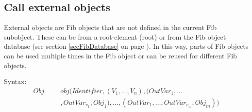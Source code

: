 

\subsection{Call external objects}
\label{fibExtObject}

External objects are Fib objects that are not defined in the current Fib subobject. These can be from a root-element (root) or from the Fib object database (see section \ref{secFibDatabase} on page \pageref{secFibDatabase}). In this way, parts of Fib objects can be used multiple times in the Fib object or can be reused for different Fib objects.

\bigskip\noindent
Syntax:
\begin{eqnarray*}
Obj &=& obj( Identifier , ( V_1 , \ldots , V_n ) , ( OutVar_{1}, \ldots  \\
  && ,OutVar_{v_1}, Obj_1), \ldots , ( OutVar_{1}, \ldots ,OutVar_{v_m}, Obj_m) )
\end{eqnarray*}


